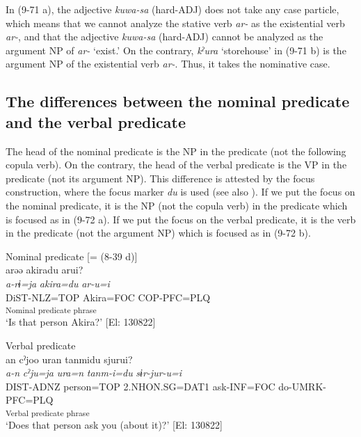 In (9-71 a), the adjective \textit{kuwa-sa} (hard-ADJ) does not take any case particle, which means that we cannot analyze the stative verb \textit{ar-} as the existential verb \textit{ar-}, and that the adjective \textit{kuwa-sa} (hard-ADJ) cannot be analyzed as the argument NP of \textit{ar-} ‘exist.’ On the contrary, \textit{kˀura} ‘storehouse’ in (9-71 b) is the argument NP of the existential verb \textit{ar-}. Thus, it takes the nominative case.

\subsection{The differences between the nominal predicate and the verbal predicate}\label{sec:9.4.3}

The head of the nominal predicate is the NP in the predicate (not the following copula verb). On the contrary, the head of the verbal predicate is the VP in the predicate (not its argument NP). This difference is attested by the focus construction, where the focus marker \textit{du} is used (see also ). If we put the focus on the nominal predicate, it is the NP (not the copula verb) in the predicate which is focused as in (9-72 a). If we put the focus on the verbal predicate, it is the verb in the predicate (not the argument NP) which is focused as in (9-72 b).

\ea   \label{ex:9.72}
\ea Nominal predicate [= (8-39 d)]\\
 \gllll  arəə  akiradu  arui?\\
    \textit{a-rɨ=ja}  \textit{akira=du}  \textit{ar-u=i}\\
    DiST-NLZ=TOP  Akira=FOC  COP-PFC=PLQ\\
      [NP  Copula verb]\textsubscript{Nominal predicate phrase}\\
    \glt     ‘Is that person Akira?’ [El: 130822]

\ex Verbal predicate\\
 \gllll  an  cˀjoo  uran  tanmidu  sjurui?\\
    \textit{a-n}  \textit{cˀju=ja}  \textit{ura=n}  \textit{tanm-i=du}  \textit{sɨr-jur-u=i}\\
    DIST{}-ADNZ  person=TOP  2.NHON.SG=DAT1  ask-INF=FOC  do-UMRK{}-PFC=PLQ\\
      [Complement  VP]\textsubscript{Verbal predicate phrase}\\
    \glt     ‘Does that person ask you (about it)?’ [El: 130822]
    \z
\z


